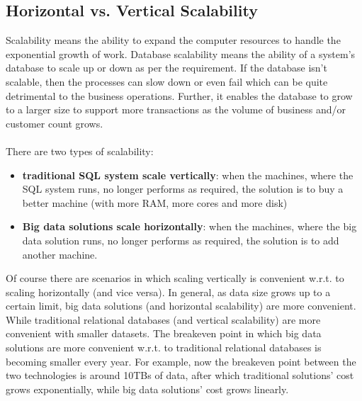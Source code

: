 \documentclass[10pt,a4paper]{article}
\newcommand{\nline}{\\~\\}
\begin{document}
\subsection{Horizontal vs. Vertical Scalability}
Scalability means the ability to expand the computer resources to handle the exponential growth   of work. Database scalability means the ability of a system’s database to scale up or down as per the requirement. If the database isn’t scalable, then the processes can slow down or even fail which can be quite detrimental to the business operations. Further, it enables the database to grow to a larger size to support more transactions as the volume of business and/or customer count grows.
\nline
There are two types of scalability:
\begin{itemize}
	\item \textbf{traditional SQL system scale vertically}: when the machines, where the SQL system runs, no longer performs as required, the solution is to buy a better machine (with more RAM, more cores and more disk)
	\item \textbf{Big data solutions scale horizontally}: when the machines, where the big data solution runs, no longer performs as required, the solution is to add another machine.
\end{itemize}
Of course there are scenarios in which scaling vertically is convenient w.r.t. to scaling horizontally (and vice versa). In general, as data size grows up to a certain limit, big data solutions (and horizontal scalability) are more convenient. While traditional relational databases (and vertical scalability) are more convenient with smaller datasets. The breakeven point in which big data solutions are more convenient w.r.t. to traditional relational databases is becoming smaller every year. For example, now the breakeven point between the two technologies is around 10TBs of data, after which traditional solutions’ cost grows exponentially, while big data solutions’ cost grows linearly.
\end{document}

